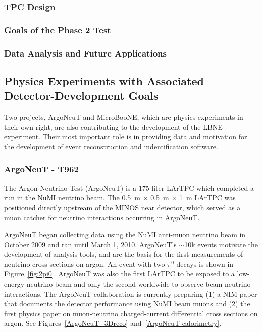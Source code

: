 \subsubsection{TPC Design}

\subsubsection{Goals of the Phase 2 Test}

\subsubsection{Data Analysis and Future Applications}


\subsection{Physics Experiments with Associated Detector-Development Goals}
Two projects, ArgoNeuT and MicroBooNE,  which are physics experiments in their own right, are also contributing to the development of the LBNE experiment. Their most important role is in providing data and motivation for the development of event reconstruction and indentification software.

\subsubsection{ArgoNeuT - T962}
The Argon Neutrino Test (ArgoNeuT) is a 175-liter LArTPC which completed a run in the NuMI neutrino beam.  The 0.5~m $\times$ 0.5~m $\times$ 1~m LArTPC was positioned directly upstream of the MINOS near detector, which served as a muon catcher for neutrino interactions occurring in ArgoNeuT. 

ArgoNeuT began collecting data using the NuMI anti-muon neutrino beam in October 2009 and ran until  March 1, 2010.  ArgoNeuT's $\sim$10k events motivate the development of analysis tools, and are the basis for the first measurements of neutrino cross sections on argon.   An event with two $\pi^{0}$ decays is shown in Figure~\ref{fig:2pi0}.   ArgoNeuT was also the first LArTPC to be exposed to a low-energy neutrino beam and only the second worldwide to observe beam-neutrino interactions. The ArgoNeuT collaboration is currently preparing (1) a NIM paper that documents the detector performance using NuMI beam muons and (2) the first physics paper on muon-neutrino charged-current differential cross sections on argon.  See Figures~\ref{ArgoNeuT_3Dreco} and~\ref{ArgoNeuT-calorimetry}.

